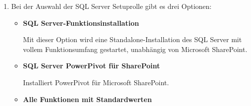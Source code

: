 \begin{enumerate}
          \item Bei der Auswahl der SQL Server Setuprolle gibt es drei Optionen:
          \begin{itemize}
              \item \textbf{SQL Server-Funktionsinstallation}
              
              Mit dieser Option wird eine Standalone-Installation des SQL Server
              mit vollem Funktionsumfang gestartet, unabhängig von Microsoft
              SharePoint.
              \item \textbf{SQL Server PowerPivot für SharePoint}
              
              Installiert PowerPivot für Microsoft SharePoint.
              \item \textbf{Alle Funktionen mit Standardwerten}
              

\end{itemize}
\end{enumerate}
